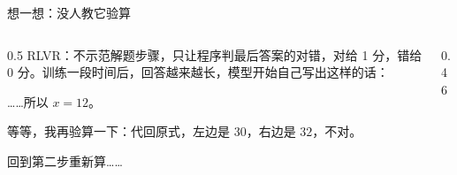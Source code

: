 \documentclass[aspectratio=169,10pt,UTF8,fontset=none]{ctexbeamer}
\begin{document}
\begin{frame}{想一想：没人教它验算}
  \begin{columns}[c]
    \begin{column}{0.5\textwidth}
      RLVR：不示范解题步骤，只让程序判最后答案的对错，对给 1 分，错给 0 分。训练一段时间后，回答越来越长，模型开始自己写出这样的话：
      \vspace{3mm}
      \begin{tcolorbox}[genaibox,colback=GMist,colframe=GMist,fontupper=\footnotesize]
        ……所以 $x=12$。\par
        等等，我再验算一下：代回原式，左边是 $30$，右边是 $32$，不对。\par
        回到第二步重新算……
      \end{tcolorbox}
      {\scriptsize{}}
    \end{column}
    \begin{column}{0.46\textwidth}
      \begin{hook}
      \end{hook}
    \end{column}
  \end{columns}
\end{frame}
\end{document}
